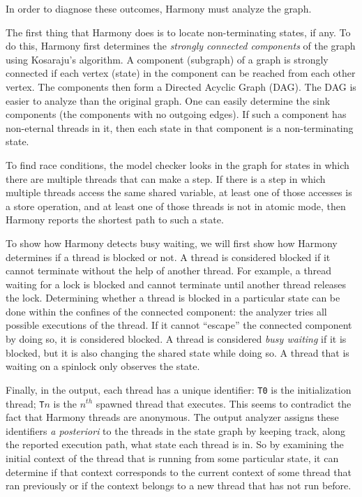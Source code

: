 \documentclass{report}
\begin{document}
\noindent
In order to diagnose these outcomes, Harmony must analyze the graph.

The first thing that Harmony does is to locate non-terminating
states, if any.  To do this, Harmony first determines the \emph{strongly
connected components} of the graph using Kosaraju's algorithm.
A component (subgraph) of a graph is strongly connected if each
vertex (state) in the component can be reached from each other vertex.
The components then form a Directed Acyclic Graph (DAG).
The DAG is easier to analyze than the original graph.
One can easily determine the sink components
(the components with no outgoing edges).  If such a component
has non-eternal threads in it, then each state in that component
is a non-terminating state.

To find race conditions, the model checker looks in the graph for
states in which there are multiple threads that can make a step.
If there is a step in which multiple threads access the same shared
variable, at least one of those accesses is a store operation, and
at least one of those threads is not in atomic mode, then Harmony
reports the shortest path to such a state.

To show how Harmony detects busy waiting, we will first show how
Harmony determines if a thread is blocked or not.  A thread is considered
blocked if it cannot terminate without the help of another thread.
For example, a thread waiting for a lock is blocked and cannot terminate
until another thread releases the lock.  Determining whether a thread
is blocked in a particular state can be done within the confines of the
connected component: the analyzer tries all possible executions of the
thread.  If it cannot ``escape'' the connected component by doing so, it
is considered blocked.
A thread is considered \emph{busy waiting} if it is blocked, but it is
also changing the shared state while doing so.  A thread that is waiting
on a spinlock only observes the state.

Finally, in the output, each thread has a unique identifier:
\texttt{T0} is the initialization thread; \texttt{T}$n$ is the $n^{th}$
spawned thread that executes.  This seems to contradict the fact that
Harmony threads are anonymous.  The output analyzer assigns these
identifiers \emph{a posteriori} to the threads in the state graph
by keeping track, along the reported execution path, what state each
thread is in.  So by examining the initial context of the thread that
is running from some particular state, it can determine if that context
corresponds to the current context of some thread that ran previously
or if the context belongs to a new thread that has not run before.
\end{document}
